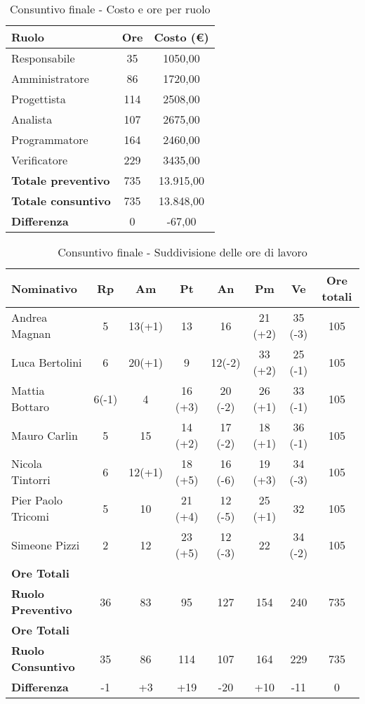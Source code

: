 \documentclass[./PianoDiProgetto.tex]{subfiles}
\begin{document}
\begin{table}[H]
		\centering

		\begin{tabular}{l * {2}{c}}
			\toprule
			\textbf{Ruolo} & \textbf{Ore} & \textbf{Costo (\euro{})} \\
			\midrule
			Responsabile & 35 & 1050,00 \\
			Amministratore  & 86 & 1720,00 \\
			Progettista  & 114 & 2508,00 \\
			Analista & 107 & 2675,00 \\
			Programmatore  & 164 &  2460,00 \\
			Verificatore  & 229 &  3435,00 \\
			\midrule
			\textbf{Totale preventivo}  & 735   &  13.915,00 \\
			\textbf{Totale consuntivo}  & 735   &  13.848,00 \\
			\midrule
			\textbf{Differenza}  & 0  &  -67,00 \\
			\bottomrule
		\end{tabular}
		\caption{Consuntivo finale - Costo e ore per ruolo}
	\end{table}


\begin{table}[H]
\centering
		\begin{tabularx}{\textwidth}{l  * {6}{c}  c}
			\toprule
			\textbf{Nominativo} & \textbf{Rp} & \textbf{Am} & \textbf{Pt}
						& \textbf{An} & \textbf{Pm} & \textbf{Ve} & \textbf{Ore totali} \\
			\midrule
			Andrea Magnan  & 5  & 13(+1) & 13 & 16 & 21 (+2)  & 35 (-3)& 105 \\
			Luca Bertolini  & 6 & 20(+1) & 9 & 12(-2) & 33 (+2) & 25 (-1) & 105 \\
			Mattia Bottaro  & 6(-1)  & 4 & 16 (+3) & 20 (-2) & 26 (+1)  & 33 (-1) & 105 \\
			Mauro Carlin  & 5 & 15 & 14 (+2) & 17 (-2) & 18 (+1) & 36 (-1) & 105 \\
			Nicola Tintorri  & 6 & 12(+1) & 18 (+5) & 16 (-6) & 19 (+3) & 34 (-3) & 105 \\
			Pier Paolo Tricomi  & 5 & 10 & 21 (+4) & 12 (-5) & 25 (+1) & 32 & 105 \\
			Simeone Pizzi & 2 & 12 & 23 (+5) & 12 (-3) & 22 & 34 (-2) & 105 \\
			\midrule
			\textbf{Ore Totali} \\ \textbf{Ruolo Preventivo} & 36    & 83   & 95   & 127   & 154 & 240   & 735 \\
			\midrule
			\textbf{Ore Totali} \\ \textbf{Ruolo Consuntivo} & 35    & 86   & 114   & 107   & 164 & 229  & 735 \\
			\midrule
			\textbf{Differenza} & -1 & +3   & +19   & -20   & +10 & -11   & 0 \\
			\bottomrule
		\end{tabularx}
		\caption{Consuntivo finale - Suddivisione delle ore di lavoro}
	\end{table}
	
\end{document}
